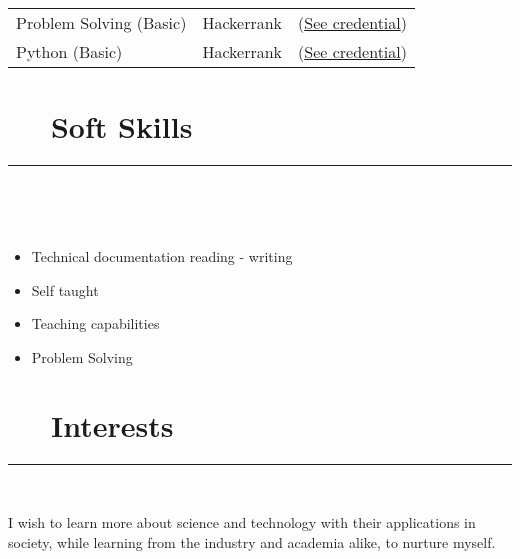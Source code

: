 \documentclass{article}
\begin{document}
\
\newline
\

\begin{tabular}{l l l}

    Problem Solving (Basic) & Hackerrank 
                            & (\href{https://www.hackerrank.com/certificates/8d1db5b492de}{See credential}) \\
    Python (Basic)  & Hackerrank 
                    & (\href{https://www.hackerrank.com/certificates/46699d054d5a}{See credential}) \\ 
\end{tabular}

\section*{\faCoffee ~~ Soft Skills} 
\hrule
\

\

\begin{multicols}{2}
    \begin{itemize}
        \item Technical documentation reading - writing
        \item Self taught
        \item Teaching capabilities
        \item Problem Solving
    \end{itemize}
\end{multicols}

\section*{\faHeartO ~~ Interests} 
\hrule

\
\newline
\

\noindent I wish to learn more about science and technology with their applications in society, while learning from the industry and academia alike, to nurture myself.
\end{document}

